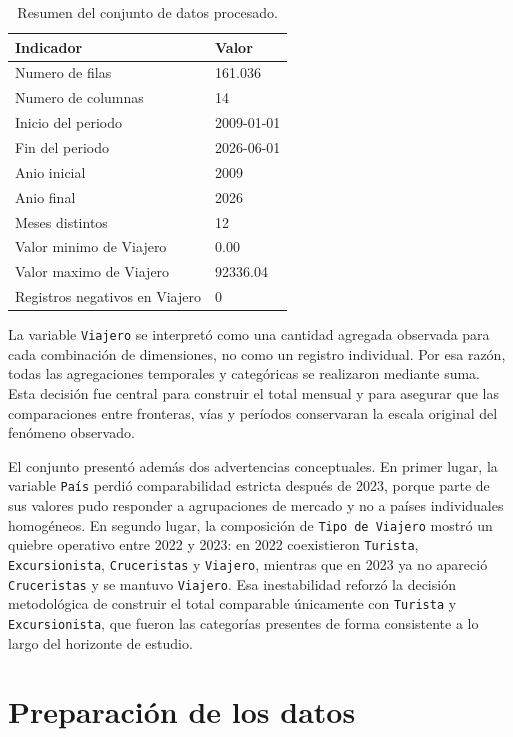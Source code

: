 \documentclass[12pt]{article}
\begin{document}
\begin{table}[H]
    \centering
    \caption{Resumen del conjunto de datos procesado.}
    \label{tab:resumen-dataset}
    \begin{tabular}{ll}
        \toprule
        Indicador & Valor \\
        \midrule
        Numero de filas & 161.036 \\
        Numero de columnas & 14 \\
        Inicio del periodo & 2009-01-01 \\
        Fin del periodo & 2026-06-01 \\
        Anio inicial & 2009 \\
        Anio final & 2026 \\
        Meses distintos & 12 \\
        Valor minimo de Viajero & 0.00 \\
        Valor maximo de Viajero & 92336.04 \\
        Registros negativos en Viajero & 0 \\
        \bottomrule
    \end{tabular}
\end{table}

La variable \texttt{Viajero} se interpretó como una cantidad agregada observada para cada combinación de dimensiones, no como un registro individual. Por esa razón, todas las agregaciones temporales y categóricas se realizaron mediante suma. Esta decisión fue central para construir el total mensual y para asegurar que las comparaciones entre fronteras, vías y períodos conservaran la escala original del fenómeno observado.

El conjunto presentó además dos advertencias conceptuales. En primer lugar, la variable \texttt{País} perdió comparabilidad estricta después de 2023, porque parte de sus valores pudo responder a agrupaciones de mercado y no a países individuales homogéneos. En segundo lugar, la composición de \texttt{Tipo de Viajero} mostró un quiebre operativo entre 2022 y 2023: en 2022 coexistieron \texttt{Turista}, \texttt{Excursionista}, \texttt{Cruceristas} y \texttt{Viajero}, mientras que en 2023 ya no apareció \texttt{Cruceristas} y se mantuvo \texttt{Viajero}. Esa inestabilidad reforzó la decisión metodológica de construir el total comparable únicamente con \texttt{Turista} y \texttt{Excursionista}, que fueron las categorías presentes de forma consistente a lo largo del horizonte de estudio.

\section{Preparación de los datos}
\end{document}
